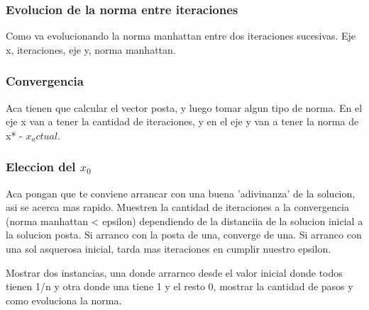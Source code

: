\subsubsection{Evolucion de la norma entre iteraciones}
Como va evolucionando la norma manhattan entre dos iteraciones sucesivas. Eje x, iteraciones, eje y, norma manhattan.

\subsubsection{Convergencia}
Aca tienen que calcular el vector posta, y luego tomar algun tipo de norma. En el eje x van a tener la cantidad de iteraciones, y en el eje y van a tener la norma de x* - $x_actual$.

\subsubsection{Eleccion del $x_0$}

Aca pongan que te conviene arrancar con una buena 'adivinanza' de la solucion, asi se acerca mas rapido. Muestren la cantidad de iteraciones a la convergencia (norma manhattan < epsilon) dependiendo de la distanciia de la solucion inicial a la solucion posta. Si arranco con la posta de una, converge de una. Si arranco con una sol asquerosa inicial, tarda mas iteraciones en cumplir nuestro epsilon.

Mostrar dos instancias, una donde arrarnco desde el valor inicial donde todos tienen 1/n y otra donde una tiene 1 y el resto 0, mostrar la cantidad de pasos y como evoluciona la norma.


